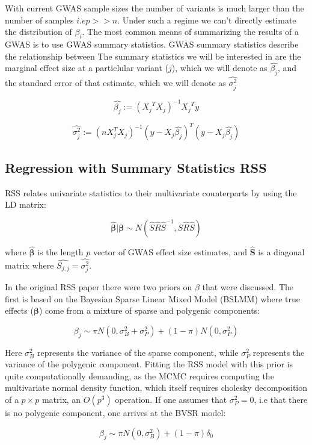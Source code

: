 With current GWAS sample sizes the number of variants is much larger than the number of samples \(i.e p >>n\).  Under such a regime we can't directly estimate the distribution of \(\beta_i\). The most common means of summarizing the results of a GWAS is to use GWAS summary statistics.  GWAS summary statistics describe the relationship between 
The summary statistics we will be interested in are the marginal effect size at a particlular variant (\(j\)), which we will denote as
\(\hat{\beta_j}\), and the standard error of that estimate, which we will denote as \(\hat{\sigma_j^2}\)

$$ \hat{\beta_j} := {({X_j}^{T}X_j)}^{-1}{X_j}^{T}y $$

$$ \hat{\sigma_j^2} := (nX_j^TX_j)^{-1}(y-X_j\hat{\beta_j})^T(y-X_j\hat{\beta_j}) $$

\subsection{Regression with Summary Statistics RSS}\label{sec:orgb0b15e2}

RSS relates univariate statistics to their multivariate counterparts by using the LD matrix:

$$ \hat{\boldsymbol{\beta}} | \boldsymbol{\beta} \sim N(\hat{S}\hat{R}\hat{S}^{-1},\hat{S}\hat{R}\hat{S}) $$

where \(\hat{\boldsymbol{\beta}}\) is the length $p$ vector of GWAS effect size estimates, and $\hat{\textbf{S}}$ is a diagonal matrix where $\hat{S_{j,j}}=\hat{\sigma_j^2}$.

In the original RSS paper there were two priors on \(\beta\) that were discussed.  The first is based on the Bayesian Sparse Linear Mixed Model (BSLMM)\cite{bslmm} where true effects ($\boldsymbol{\beta}$)
come from a mixture of sparse and polygenic components:

$$ \beta_j \sim \pi N(0,\sigma^2_B+\sigma^2_P)+(1-\pi) N(0,\sigma^2_P) $$

Here \(\sigma^2_B\) represents the variance of the sparse component, while \(\sigma^2_P\) represents the variance of the polygenic component. Fitting the RSS model with this prior is quite computationally demanding, 
as the MCMC requires computing the multivariate normal density function, which itself requires cholesky decomposition of a \(p \times p\) matrix, an \(O(p^3)\) operation.  If one assumes that \(\sigma^2_P=0\),
i.e that there is no polygenic component, one arrives at the BVSR model:

$$ \beta_j \sim \pi N(0,\sigma^2_B)+(1-\pi) \delta_0 $$

